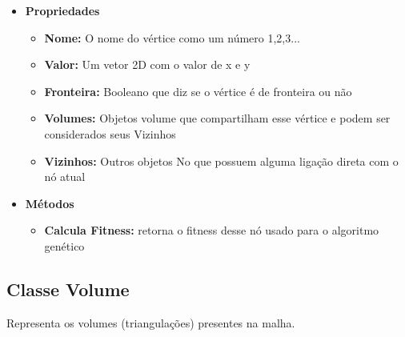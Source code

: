 \begin{itemize}
    \item \textbf{Propriedades}
    \begin{itemize}
        \item \textbf{Nome:} O nome do vértice como um número 1,2,3...
        \item \textbf{Valor:} Um vetor 2D com o valor de x e y
        \item \textbf{Fronteira:} Booleano que diz se o vértice é de fronteira ou não
        \item \textbf{Volumes:} Objetos volume que compartilham esse vértice e podem ser considerados seus Vizinhos
        \item \textbf{Vizinhos:} Outros objetos No que possuem alguma ligação direta com o nó atual
    \end{itemize}
    \item \textbf{Métodos}
    \begin{itemize}
        \item \textbf{Calcula Fitness:} retorna o fitness desse nó usado para o algoritmo genético
    \end{itemize}
\end{itemize}

\subsection{Classe Volume}
Representa os volumes (triangulações) presentes na malha.

